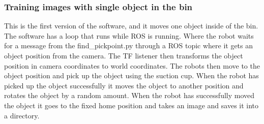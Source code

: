 \subsubsection{Training images with single object in the bin}\label{robotcontrol}
This is the first version of the software, and it moves one object inside of the bin. The software has a loop that runs while ROS is running. 
Where the robot waits for a message from the find\_pickpoint.py through a ROS topic where it gets an object position from the camera.
The TF listener then transforms the object position in camera coordinates to world coordinates. The robots then move to the object position and pick up the object using the suction cup. When the robot has picked up the object successfully it moves the object to another position and rotates the object by a random amount. When the robot has successfully moved the object it goes to the fixed home position and takes an image and saves it into a directory. 

